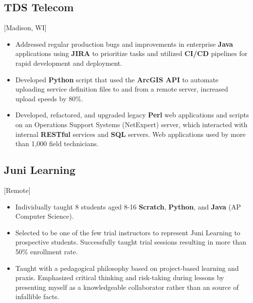 \documentclass{mycv}
\begin{document}
\subsection{TDS Telecom}[Madison, WI]
\begin{positions}
\end{positions}
\begin{itemize}
  \item {
  Addressed regular production bugs and improvements in enterprise \textbf{Java}
applications using \textbf{JIRA} to prioritize tasks and utilized \textbf{CI/CD} pipelines for
rapid development and deployment.
  }
  \item {
  Developed \textbf{Python} script that used the \textbf{ArcGIS API} to automate uploading
service definition files to and from a remote server, increased upload speeds
by 80\%.
}
  \item {
  Developed, refactored, and upgraded legacy \textbf{Perl} web applications and scripts
on an Operations Support Systems (NetExpert) server, which interacted with
internal \textbf{RESTful} services and \textbf{SQL} servers. Web applications used by more than 1,000
field technicians.
  }
\end{itemize}


\subsection{Juni Learning}[Remote]
\begin{positions}
\end{positions}
\begin{itemize}
  \item {
  Individually taught 8 students aged 8-16 \textbf{Scratch}, \textbf{Python}, and \textbf{Java} (AP Computer Science). 
  }
  \item{
    Selected to be one of the few trial instructors to represent Juni Learning to prospective students.
  Successfully taught trial sessions resulting in more than 50\% enrollment rate.
  }
  \item{
    Taught with a pedagogical philosophy based on project-based learning and praxis.
    Emphasized critical thinking and risk-taking during lessons by presenting myself as a
    knowledgeable collaborator rather than an source of infallible facts. 
  }
\end{itemize}

\end{document}
